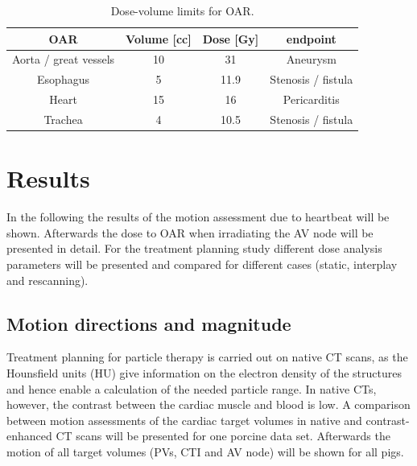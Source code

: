 
\begin{table}[H]
  \centering
  \caption{Dose-volume limits for OAR.}
  \begin{tabular}{|c|c|c|c|}
    \hline\hline
    OAR & Volume [cc] & Dose [Gy] & endpoint \\
    \hline
    Aorta / great vessels & 10 & 31 & Aneurysm \\
    Esophagus & 5 & 11.9 &  Stenosis / fistula \\
    Heart & 15 & 16 & Pericarditis \\
    Trachea & 4 & 10.5 & Stenosis / fistula \\
    \hline\hline
  \end{tabular}
  \label{tab:RTOG:pig}
\end{table}


\section{Results}

In the following the results of the motion assessment due to heartbeat will be shown. Afterwards the dose to OAR when irradiating the AV node 
will be presented in detail. For the treatment planning study different dose analysis parameters will be presented and compared for different 
cases (static, interplay and rescanning). 

\subsection{Motion directions and magnitude}
\label{subsec:motion:pigs}
Treatment planning for particle therapy is carried out on native CT scans, as the Hounsfield units (HU) give information on the electron 
density of the structures and hence enable a calculation of the needed particle range. 
In native CTs, however, the contrast between the cardiac muscle and blood is low.  
A comparison between motion assessments of the cardiac target volumes 
in native and contrast-enhanced CT scans will be presented for one porcine data set. Afterwards the motion of all target volumes (PVs, CTI and 
AV node) will be shown for all pigs. 

